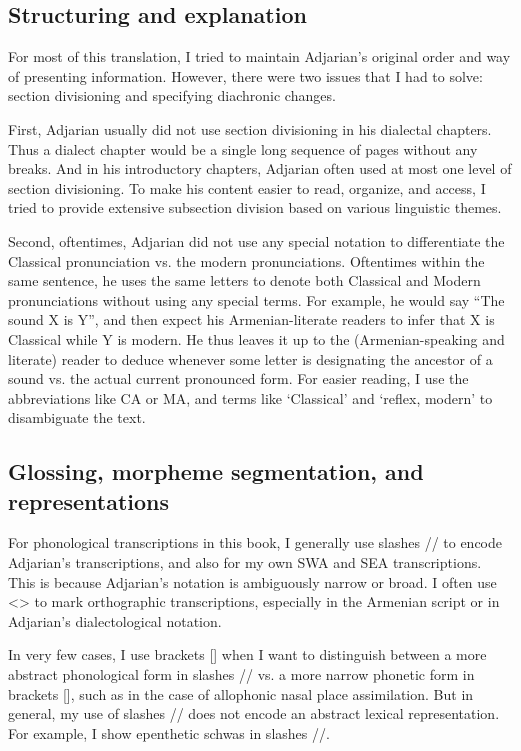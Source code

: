 \subsection{Structuring and explanation}\label{sec:HossepIntro:translation:exp}
For most of this translation, I tried to maintain Adjarian's original order and way of presenting information. However, there were two issues that I had to solve: section divisioning and specifying diachronic changes. 


First, Adjarian usually did not use section divisioning in his dialectal chapters. Thus a dialect chapter would be a single long sequence of pages without any breaks. And in his introductory chapters, Adjarian often used at most one level of section divisioning. To make his content easier to read, organize, and access, I tried to provide extensive subsection division based on various linguistic themes. 

Second,  oftentimes, Adjarian did not use any special notation to differentiate the Classical pronunciation vs. the modern pronunciations. Oftentimes within the same sentence, he uses the same letters to denote both Classical and Modern pronunciations without using any special terms. For example, he would say  ``The sound X is Y'', and then expect his Armenian-literate readers to  infer that X is Classical while Y is modern. He thus leaves it up to the (Armenian-speaking and literate) reader to deduce whenever some letter is designating the ancestor of a sound vs. the actual current pronounced form. 	For easier reading, I use the abbreviations like CA or MA, and terms like `Classical' and `reflex, modern' to disambiguate the text.   


\subsection{Glossing, morpheme segmentation, and representations}\label{sec:HossepIntro:translation:gloss}

For phonological transcriptions in this book, I generally use slashes // to encode Adjarian's transcriptions, and also for my own SWA and SEA transcriptions. This is because Adjarian's notation is ambiguously narrow or broad. I often use <> to mark orthographic transcriptions, especially in the Armenian script or in Adjarian's dialectological notation. 

In very few cases, I use brackets [] when I want to distinguish between a more abstract phonological form in slashes // vs. a more narrow phonetic form in brackets [], such as in the case of allophonic nasal place assimilation. But in general, my use of slashes // does not encode an abstract lexical representation. For example, I show epenthetic schwas in slashes //. 

